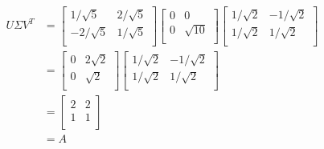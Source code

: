 \documentclass[11pt]{article}
\begin{document}
$$\begin{aligned}
U \Sigma V^T &=\begin{bmatrix}
1 / \sqrt5 & 2 / \sqrt5 \\
-2 / \sqrt5 & 1 / \sqrt5 \\
\end{bmatrix} \begin{bmatrix}
0 & 0 \\
0 & \sqrt{10} \\
\end{bmatrix} \begin{bmatrix}
1 / \sqrt2 & -1 / \sqrt2 \\
1 / \sqrt2 & 1 / \sqrt2 \\
\end{bmatrix} \\
&= \begin{bmatrix}
0 & 2 \sqrt2 \\
0 & \sqrt2 \\
\end{bmatrix} \begin{bmatrix}
1 / \sqrt2 & -1 / \sqrt2 \\
1 / \sqrt2 & 1 / \sqrt2 \\
\end{bmatrix} \\
&= \begin{bmatrix}
2 & 2 \\
1 & 1 \\
\end{bmatrix} \\
&= \boxed{A}
\end{aligned} $$
\end{document}
